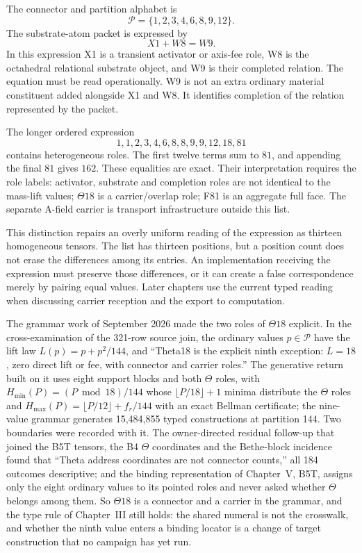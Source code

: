 The connector and partition alphabet is
\begin{equation}
\mathcal P=\{1,2,3,4,6,8,9,12\}.
\end{equation}
The substrate-atom packet is expressed by
\begin{equation}
X1+W8=W9.
\end{equation}
In this expression X1 is a transient activator or axis-fee role, W8 is the octahedral relational substrate object, and W9 is their completed relation. The equation must be read operationally. W9 is not an extra ordinary material constituent added alongside X1 and W8. It identifies completion of the relation represented by the packet.

The longer ordered expression
\begin{equation}
1,1,2,3,4,6,8,8,9,9,12,18,81
\end{equation}
contains heterogeneous roles. The first twelve terms sum to $81$, and appending the final $81$ gives $162$. These equalities are exact. Their interpretation requires the role labels: activator, substrate and completion roles are not identical to the mass-lift values; $\Theta18$ is a carrier/overlap role; F81 is an aggregate full face. The separate A-field carrier is transport infrastructure outside this list.

This distinction repairs an overly uniform reading of the expression as thirteen homogeneous tensors. The list has thirteen positions, but a position count does not erase the differences among its entries. An implementation receiving the expression must preserve those differences, or it can create a false correspondence merely by pairing equal values. Later chapters use the current typed reading when discussing carrier reception and the export to computation.\cite{viiatom}

The grammar work of September 2026 made the two roles of $\Theta18$ explicit. In the cross-examination of the 321-row source join, the ordinary values $p\in\mathcal P$ have the lift law $L(p)=p+p^2/144$, and ``Theta18 is the explicit ninth exception: $L=18$, zero direct lift or fee, with connector and carrier roles.'' The generative return built on it uses eight support blocks and both $\Theta$ roles, with $H_{\min}(P)=(P \bmod 18)/144$ whose $\lfloor P/18\rfloor+1$ minima distribute the $\Theta$ roles and $H_{\max}(P)=\lfloor P/12\rfloor+f_r/144$ with an exact Bellman certificate; the nine-value grammar generates 15,484,855 typed constructions at partition 144.\cite{viigrammar} Two boundaries were recorded with it. The owner-directed residual follow-up that joined the B5T tensors, the B4 $\Theta$ coordinates and the Bethe-block incidence found that ``Theta address coordinates are not connector counts,'' all 184 outcomes descriptive; and the binding representation of Chapter~V, B5T, assigns only the eight ordinary values to its pointed roles and never asked whether $\Theta$ belongs among them. So $\Theta18$ is a connector and a carrier in the grammar, and the type rule of Chapter~III still holds: the shared numeral is not the crosswalk, and whether the ninth value enters a binding locator is a change of target construction that no campaign has yet run.

